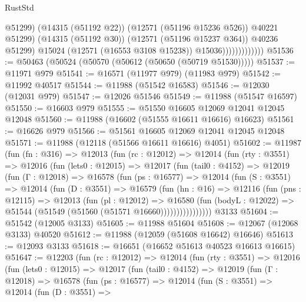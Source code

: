 \begin{lexlean}{RustStd}
\begin{coremodule}
                                    @51299)
                                  (@14315 (@51192 @22))
                                  (@12571 (@51196 @15236 @526))
                                  @40221
                                  @51299)
                                (@14315 (@51192 @30))
                                (@12571 (@51196 @15237 @364))
                                @40236
                                @51299)
                              @15024
                              (@12571 (@16553 @3108 @15238))
                              @15036)))))))))))))
@51536 := @50463 (@50524 (@50570 (@50612 (@50650 (@50719 @51530)))))
@51537 := @11971 @979
@51541 := @16571 (@11977 @979) (@11983 @979)
@51542 := @11992 @40517
@51544 := @11988 (@51542 @16583)
@51546 := @12030 (@12031 @979)
@51547 := @12026 @51546
@51549 := @11988 (@51547 @16597)
@51550 := @16603 @979
@51555 := @51550 @16605 @12069 @12041 @12045 @12048
@51560 := @11988 (@16602 (@51555 @16611 @16616) @16623)
@51561 := @16626 @979
@51566 := @51561 @16605 @12069 @12041 @12045 @12048
@51571 := @11988 (@12118 (@51566 @16611 @16616) @4051)
@51602 := @11987
    (fun (fn : @316) =>
    @12013
      (fun (rc : @12012) =>
      @12014
        (fun (rty : @3551) =>
        @12016
          (fun (lets0 : @12015) =>
          @12017
            (fun (tail0 : @4152) =>
            @12019
              (fun (Γ : @12018) =>
              @16578
                (fun (ps : @16577) =>
                @12014
                  (fun (S : @3551) =>
                  @12014
                    (fun (D : @3551) =>
                    @16579
                      (fun (hn : @16) =>
                      @12116
                        (fun (pns : @12115) =>
                        @12013
                          (fun (pl : @12012) =>
                          @16580
                            (fun (bodyL : @12022) =>
                            @51544 (@51549 (@51560 (@51571 @16660))))))))))))))))
    @3133
@51604 := @51542 (@12005 @3133)
@51605 := @11988 @51604
@51608 := @12067 (@12068 @3133) @40520
@51612 := @11988 (@12059 (@51608 @16642) @16646)
@51613 := @12093 @3133
@51618 := @16651 (@16652 @51613 @40523 @16613 @16615)
@51647 := @12203
    (fun (rc : @12012) =>
    @12014
      (fun (rty : @3551) =>
      @12016
        (fun (lets0 : @12015) =>
        @12017
          (fun (tail0 : @4152) =>
          @12019
            (fun (Γ : @12018) =>
            @16578
              (fun (ps : @16577) =>
              @12014
                (fun (S : @3551) =>
                @12014
                  (fun (D : @3551) =>

\end{coremodule}
\end{lexlean}
